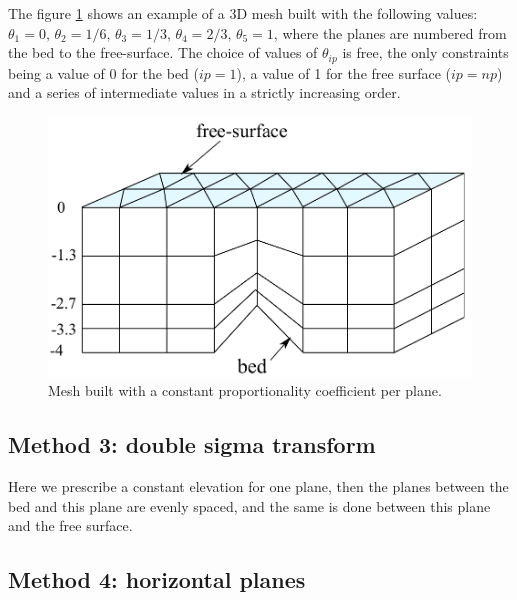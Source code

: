 The figure \ref{maillage 3D 2} shows an example of a 3D mesh built with the
following values:
$\theta_{1}=0,\,\theta_{2}=1/6,\,\theta_{3}=1/3,\,\theta_{4}=2/3,\,\theta_{5}=1$, where the planes are numbered
from the bed to the free-surface. The choice of values of
$\theta_{ip}$ is free, the only constraints being a value of $0$ for the
bed ($ip=1$), a value of 1 for the free surface ($ip=np$) and a series of
intermediate values in a strictly increasing order.

\begin{figure}[tbh]
\centering
\includegraphics[scale=0.5]{graphics/mesh_theta.pdf}
\caption{Mesh built with a constant proportionality coefficient per plane.}%
\label{maillage 3D 2}
\end{figure}

\subsection{\label{maillage 3D methode 3}Method 3: double sigma transform}

Here we prescribe a constant elevation for one plane, then the planes between
the bed and this plane are evenly spaced, and the same is done between this
plane and the free surface.

\subsection{\label{maillage 3D methode 4}Method 4: horizontal planes}

